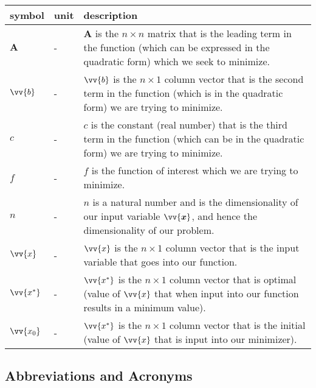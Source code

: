 \documentclass[12pt]{article}
\begin{document}
\renewcommand{\arraystretch}{1.2}
\noindent \begin{longtable*}{l l p{12cm}} \toprule
\textbf{symbol} & \textbf{unit} & \textbf{description}\\
\midrule 
$\mathbf{A}$ & \si[per-mode=symbol] {-} & $\mathbf{A}$ is the $n \times n$ matrix that is the leading term in the function (which can be expressed in the quadratic form) which we seek to minimize.
\\
$\vv{b}$ & \si[per-mode=symbol] {-} & $\vv{b}$ is the $n \times 1$ column vector that is the second term in the function (which is in the quadratic form) we are trying to minimize. 
\\ 
$c$ & \si[per-mode=symbol] {-} & $c$ is the constant (real number) that is the third term in the function (which can be in the quadratic form) we are trying to minimize.
\\
$f$ & \si[per-mode=symbol] {-} & $f$ is the function of interest which we are trying to minimize.  
\\
$n$ & \si[per-mode=symbol] {-} & $n$ is a natural number and is the dimensionality of our input variable $\vv{\bm{x}}$, and hence the dimensionality of our problem. 
\\
$\vv{{x}}$ & \si[per-mode=symbol] {-} & $\vv{{x}}$ is the $n \times 1$ column vector that is the input variable that goes into our function.
\\
$\vv{{x^*}}$ & \si[per-mode=symbol] {-} & $\vv{{x^*}}$ is the $n \times 1$ column vector that is optimal (value of $\vv{{x}}$ that when input into our function results in a minimum value).
\\
$\vv{{x_0}}$ & \si[per-mode=symbol] {-} & $\vv{{x^*}}$ is the $n \times 1$ column vector that is the initial (value of $\vv{{x}}$ that is input into our minimizer).
\\
\bottomrule
\end{longtable*}

\subsection{Abbreviations and Acronyms}
\end{document}
